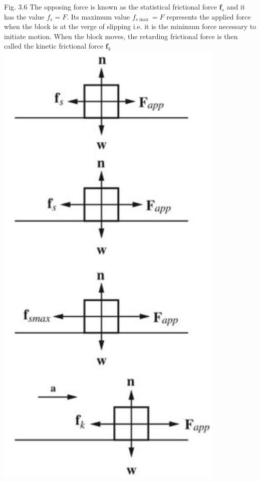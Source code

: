 \documentclass[10pt]{article}
\begin{document}
Fig. 3.6 The opposing force is known as the statistical frictional force $\mathbf{f}_{s}$ and it has the value $f_{s}=F$. Its maximum value $f_{s \max }=F$ represents the applied force when the block is at the verge of slipping i.e. it is the minimum force necessary to initiate motion. When the block moves, the retarding frictional force is then called the kinetic frictional force $\mathbf{f}_{k}$\\
\includegraphics[max width=\textwidth, center]{2024_09_13_db1f357d2aad0a03eb2eg-053(1)}\\
\end{document}
